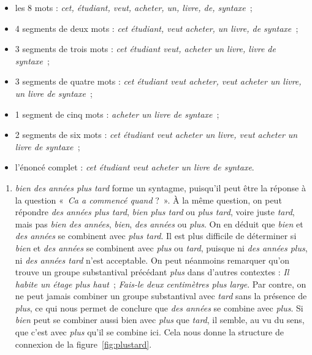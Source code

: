 {\begin{itemize}
\item les 8 mots : \textit{cet, étudiant, veut, acheter, un, livre, de, syntaxe~};
\item 4 segments de deux mots : \textit{cet étudiant, veut acheter, un livre, de syntaxe~};
\item 3 segments de trois mots : \textit{cet étudiant veut, acheter un livre, livre de syntaxe~};
\item 3 segments de quatre mots : \textit{cet étudiant veut acheter, veut acheter un livre, un livre de syntaxe~};
\item 1 segment de cinq mots : \textit{acheter un livre de syntaxe~};
\item 2 segments de six mots : \textit{cet étudiant veut acheter un livre, veut acheter un livre de syntaxe~};
\item l’énoncé complet : \textit{cet étudiant veut acheter un livre de syntaxe}.
\end{itemize}

\begin{enumerate}[label=\alph*.]
\item \textit{bien des années plus tard} forme un syntagme, puisqu’il peut être la réponse à la question «~\textit{Ca a commencé quand} ?~». À la même question, on peut répondre \textit{des années plus tard}, \textit{bien plus tard} ou \textit{plus tard}, voire juste \textit{tard}, mais pas \textit{bien des années}, \textit{bien}, \textit{des années} ou \textit{plus}. On en déduit que \textit{bien} et \textit{des années} se combinent avec \textit{plus tard}. Il est plus difficile de déterminer si \textit{bien} et \textit{des années} se combinent avec \textit{plus} ou \textit{tard}, puisque ni \textit{des années plus}, ni \textit{des années tard} n’est acceptable. On peut néanmoins remarquer qu’on trouve un groupe substantival précédant \textit{plus} dans d’autres contextes : \textit{Il habite un étage plus haut~}; \textit{Fais-le deux centimètres plus large}. Par contre, on ne peut jamais combiner un groupe substantival avec \textit{tard} sans la présence de \textit{plus}, ce qui nous permet de conclure que \textit{des années} se combine avec \textit{plus}. Si \textit{bien} peut se combiner aussi bien avec \textit{plus} que \textit{tard}, il semble, au vu du sens, que c’est avec \textit{plus} qu’il se combine ici. Cela nous donne la structure de connexion de la figure~\ref{fig:plustard}.
   
\begin{figure}[H]
\begin{center}
\end{center}
\end{figure}
\end{enumerate}}
